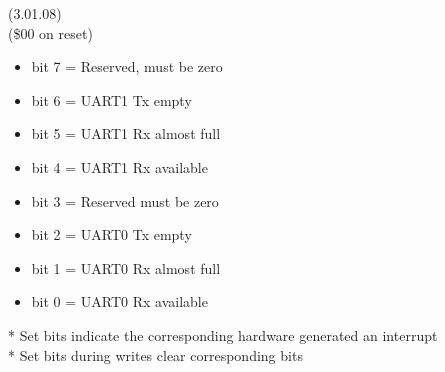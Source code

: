  (3.01.08)\\
(\$00 on reset)
\begin{itemize}
\item bit 7 = Reserved, must be zero
\item bit 6 = UART1 Tx empty
\item bit 5 = UART1 Rx almost full
\item bit 4 = UART1 Rx available
\item bit 3 = Reserved must be zero
\item bit 2 = UART0 Tx empty
\item bit 1 = UART0 Rx almost full
\item bit 0 = UART0 Rx available
\end{itemize}
* Set bits indicate the corresponding hardware generated an interrupt\\
* Set bits during writes clear corresponding bits



